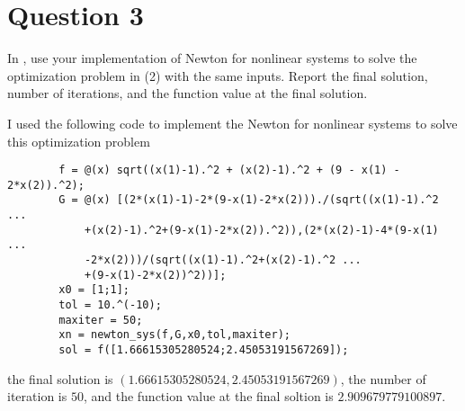 \section{Question 3}

\begin{question}
    In \MATLAB, use your implementation of Newton for nonlinear systems to solve the optimization problem in (2) with the same inputs. Report the final solution, number of iterations, and the function value at the final solution.
\end{question}

\begin{answer}
    I used the following code to implement the Newton for nonlinear systems to solve this optimization problem
    \begin{verbatim}
        f = @(x) sqrt((x(1)-1).^2 + (x(2)-1).^2 + (9 - x(1) - 2*x(2)).^2);
        G = @(x) [(2*(x(1)-1)-2*(9-x(1)-2*x(2)))./(sqrt((x(1)-1).^2 ...
            +(x(2)-1).^2+(9-x(1)-2*x(2)).^2)),(2*(x(2)-1)-4*(9-x(1) ...
            -2*x(2)))/(sqrt((x(1)-1).^2+(x(2)-1).^2 ...
            +(9-x(1)-2*x(2))^2))];
        x0 = [1;1];
        tol = 10.^(-10);
        maxiter = 50;
        xn = newton_sys(f,G,x0,tol,maxiter);
        sol = f([1.66615305280524;2.45053191567269]);
    \end{verbatim}
    the final solution is $(1.66615305280524,2.45053191567269)$, the number of iteration is $50$, and the function value at the final soltion is $2.909679779100897$.
\end{answer}